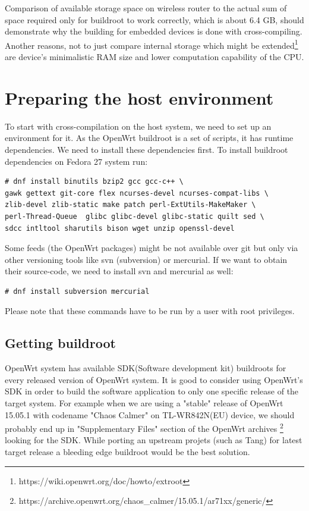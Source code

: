 Comparison of available storage space on wireless router to the actual sum of space required only for buildroot to work correctly, which is about 6.4 GB, should demonstrate why the building for embedded devices is done with cross-compiling. %
Another reasons, not to just compare internal storage which might be extended\footnote{https://wiki.openwrt.org/doc/howto/extroot} are device's minimalistic RAM size and lower computation capability of the CPU.



\section{Preparing the host environment}

To start with cross-compilation on the host system, we need to set up an environment for it.
As the OpenWrt buildroot is a set of scripts, it has runtime dependencies.
We need to install these dependencies first.
To install buildroot dependencies on Fedora 27 system run:
\begin{lstlisting}[columns=fixed,basicstyle=\ttfamily\footnotesize,tabsize=4,backgroundcolor=\color{yellow!10}]
# dnf install binutils bzip2 gcc gcc-c++ \
gawk gettext git-core flex ncurses-devel ncurses-compat-libs \
zlib-devel zlib-static make patch perl-ExtUtils-MakeMaker \
perl-Thread-Queue  glibc glibc-devel glibc-static quilt sed \
sdcc intltool sharutils bison wget unzip openssl-devel
\end{lstlisting}
Some feeds (the OpenWrt packages) might be not available over git but only via other versioning tools like svn (subversion) or mercurial.
If we want to obtain their source-code, we need to install svn and mercurial as well:
\begin{lstlisting}[columns=fixed,basicstyle=\ttfamily\footnotesize,tabsize=4,backgroundcolor=\color{yellow!10}]
# dnf install subversion mercurial
\end{lstlisting}
Please note that these commands have to be run by a user with root privileges.



\subsection{Getting buildroot}

OpenWrt system has available SDK(Software development kit) buildroots for every released version of OpenWrt system.
It is good to consider using OpenWrt's SDK in order to build the software application to only one specific release of the target system.
For example when we are using a "stable" release of OpenWrt 15.05.1 with codename "Chaos Calmer" on TL-WR842N(EU) device, we should probably end up in "Supplementary Files" section of the OpenWrt archives
\footnote{https://archive.openwrt.org/chaos\_calmer/15.05.1/ar71xx/generic/} looking for the SDK.
While porting an upstream projets (such as Tang) for latest target release a bleeding edge buildroot would be the best solution.

